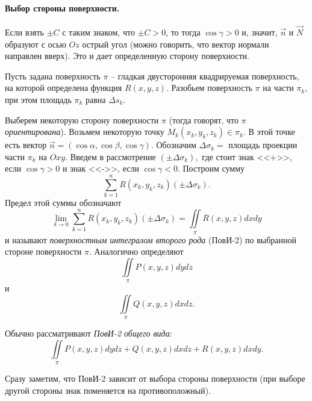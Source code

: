 \documentclass[../../main.tex]{subfiles}
\begin{document}
		\paragraph{Выбор стороны поверхности.}
		Если взять $\pm C$ с таким знаком, что $\pm C > 0$, то тогда $\cos \gamma
		 > 0$ и, значит, $\vec{n}$ и $\vec{N}$ образуют с осью
		  $Oz$ острый угол (можно говорить, что вектор нормали направлен вверх).
		   Это и дает определенную сторону поверхности.
		   
		Пусть задана поверхность $\pi$ \--- гладкая двусторонняя квадрируемая
	 поверхность, на которой определена функция $R(x,y,z)$. Разобьем поверхность 
	 $\pi$ на части	
	  $\pi_k$, при этом площадь $\pi_k$ равна $\Delta s_k$.
	  
	  Выберем некоторую сторону
	  поверхности $\pi$ (тогда говорят, что $\pi$ \emph{ориентирована}). Возьмем 
	  некоторую точку
      $M_k(x_k, y_k, z_k) \in \pi_k$. В этой точке есть вектор	
      $\vec{n} =
       (\cos \alpha, \cos \beta, \cos \gamma).$ Обозначим $\Delta \sigma_k = $
        площадь проекции части $\pi_k$ на $Oxy$. Введем в рассмотрение $(\pm
        \Delta\sigma_k),$ где стоит знак <<+>>, если $\cos \gamma > 0$ и 
        знак
         <<->>, если $\cos \gamma < 0$. Построим сумму 
         \[\sum\limits_{k=1}^n
         R(x_k, y_k, z_k)(\pm \Delta\sigma_k).\] Предел этой суммы обозначают
         \[\lim\limits_{\delta \to 0} \sum\limits_{k=1}^n R(x_k, y_k, z_k)(\pm
         \Delta\sigma_k) = \iint \limits_\pi R(x, y, z) dx dy\] и называют
         \emph{поверхностным интегралом второго рода} (ПовИ-2) по выбранной 
         стороне
         поверхности $\pi$. Аналогично определяют \[\iint \limits_\pi P(x, y, 
         z) 
         dydz\] и \[\iint \limits_\pi Q(x, y, z) dxdz .\]
         
         Обычно рассматривают
          \emph{ПовИ-2 общего вида}:
		\[\iint \limits_\pi P(x, y, z) dydz + Q(x, y, z) dxdz
		 + R(x, y, z) dxdy. \]
		 
		Сразу заметим, что ПовИ-2 зависит от выбора стороны поверхности (при выборе 
		другой
		 стороны знак поменяется на противоположный).
	
\end{document}
